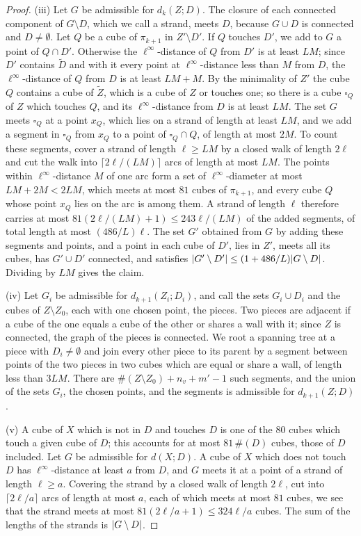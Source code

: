 \documentclass[11pt]{preprint}
\DeclarePairedDelimiter{\abs}{\lvert}{\rvert}
\numberwithin{equation}{section}
\theoremstyle{definition}
\theoremstyle{remark}
\theoremstyle{plain}
\begin{document}
\begin{proof}
(iii) Let $G$ be admissible for $d_k(Z; D)$. The closure of each connected component of $G \setminus D$, which we call a strand, meets $D$, because $G \cup D$ is connected and $D \neq \emptyset$. Let $Q$ be a cube of $\pi_{k+1}$ in $Z' \setminus D'$. If $Q$ touches $D'$, we add to $G$ a point of $Q \cap D'$. Otherwise the $\ell^\infty$-distance of $Q$ from $D'$ is at least $LM$; since $D'$ contains $\tilde D$ and with it every point at $\ell^\infty$-distance less than $M$ from $D$, the $\ell^\infty$-distance of $Q$ from $D$ is at least $LM + M$. By the minimality of $Z'$ the cube $Q$ contains a cube of $\tilde Z$, which is a cube of $Z$ or touches one; so there is a cube $\square_Q$ of $Z$ which touches $Q$, and its $\ell^\infty$-distance from $D$ is at least $LM$. The set $G$ meets $\square_Q$ at a point $x_Q$, which lies on a strand of length at least $LM$, and we add a segment in $\square_Q$ from $x_Q$ to a point of $\square_Q \cap Q$, of length at most $2M$. To count these segments, cover a strand of length $\ell \geq LM$ by a closed walk of length $2\ell$ and cut the walk into $\lceil 2\ell/(LM)\rceil$ arcs of length at most $LM$. The points within $\ell^\infty$-distance $M$ of one arc form a set of $\ell^\infty$-diameter at most $LM + 2M < 2LM$, which meets at most $81$ cubes of $\pi_{k+1}$, and every cube $Q$ whose point $x_Q$ lies on the arc is among them. A strand of length $\ell$ therefore carries at most $81(2\ell/(LM) + 1) \leq 243\ell/(LM)$ of the added segments, of total length at most $(486/L)\ell$. The set $G'$ obtained from $G$ by adding these segments and points, and a point in each cube of $D'$, lies in $Z'$, meets all its cubes, has $G' \cup D'$ connected, and satisfies $\abs{G' \setminus D'} \leq (1 + 486/L)\abs{G \setminus D}$. Dividing by $LM$ gives the claim.

(iv) Let $G_i$ be admissible for $d_{k+1}(Z_i; D_i)$, and call the sets $G_i \cup D_i$ and the cubes of $Z \setminus Z_0$, each with one chosen point, the pieces. Two pieces are adjacent if a cube of the one equals a cube of the other or shares a wall with it; since $Z$ is connected, the graph of the pieces is connected. We root a spanning tree at a piece with $D_i \neq \emptyset$ and join every other piece to its parent by a segment between points of the two pieces in two cubes which are equal or share a wall, of length less than $3LM$. There are $\#(Z \setminus Z_0) + n_v + m' - 1$ such segments, and the union of the sets $G_i$, the chosen points, and the segments is admissible for $d_{k+1}(Z; D)$.

(v) A cube of $X$ which is not in $D$ and touches $D$ is one of the $80$ cubes which touch a given cube of $D$; this accounts for at most $81\,\#(D)$ cubes, those of $D$ included. Let $G$ be admissible for $d(X; D)$. A cube of $X$ which does not touch $D$ has $\ell^\infty$-distance at least $a$ from $D$, and $G$ meets it at a point of a strand of length $\ell \geq a$. Covering the strand by a closed walk of length $2\ell$, cut into $\lceil 2\ell/a\rceil$ arcs of length at most $a$, each of which meets at most $81$ cubes, we see that the strand meets at most $81(2\ell/a + 1) \leq 324\ell/a$ cubes. The sum of the lengths of the strands is $\abs{G \setminus D}$.
\end{proof}
\end{document}
